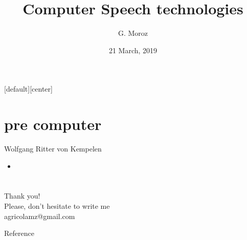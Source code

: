 
[default][center]
\title[]{Computer Speech technologies}
\author[]{G. Moroz}
\date{21 March, 2019}

\frame{\titlepage}

\section{pre computer}

\begin{frame}{Wolfgang Ritter von Kempelen}
\begin{itemize}
\item \href{https://books.google.ru/books?hl=pl&lr=&id=3MRJAAAAcAAJ&oi=fnd&pg=PA1&dq=Mechanismus+der+menschlichen+Sprache+nebst+Beschreibung+einer+sprechenden+Maschine&ots=MW2q1Xb0dG&sig=qwlXuPxE6P_Ruryv-FXckqV10Pk&redir_esc=y\#v=onepage&q=Mechanismus\%20der\%20menschlichen\%20Sprache\%20nebst\%20Beschreibung\%20einer\%20sprechenden\%20Maschine&f=false}{\cite{kempelen91}}
\end{itemize}
\end{frame}

\section{}
\begin{frame}
{\huge Thank you!\bigskip\\
\normalsize Please, don't hesitate to write me\\
agricolamz@gmail.com
\vspace{-130pt}}
\end{frame}
\begin{frame}{Reference}
\footnotesize


\end{frame}

